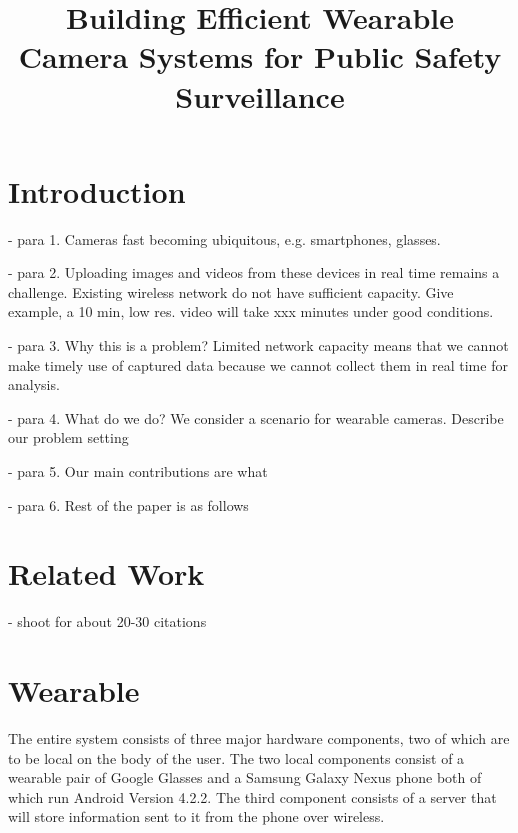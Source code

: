 \documentclass[conference]{IEEEtran}
\begin{document}

\title{Building Efficient Wearable Camera Systems for Public Safety Surveillance}
\author{
}

\maketitle

\begin{abstract}


\end{abstract}

\section{Introduction}
- para 1. Cameras fast becoming ubiquitous, e.g. smartphones, glasses. 

- para 2. Uploading images and videos from these devices in real time remains a challenge. Existing wireless network do not have sufficient capacity. Give example, a 10 min, low res. video will take xxx minutes under good conditions.

- para 3. Why this is a problem? Limited network capacity means that we cannot make timely use of captured data because we cannot collect them in real time for analysis. 

- para 4. What do we do? We consider a scenario for wearable cameras. Describe our problem setting

- para 5. Our main contributions are what

- para 6. Rest of the paper is as follows 

\section{Related Work}
- shoot for about 20-30 citations

\section{Wearable }
The entire system consists of three major hardware components, two of which are to be local on the body of the user. The two local components consist of a wearable pair of Google Glasses and a Samsung Galaxy Nexus phone both of which run Android Version 4.2.2. The third component consists of a server that will store information sent to it from the phone over wireless.
\end{document}
